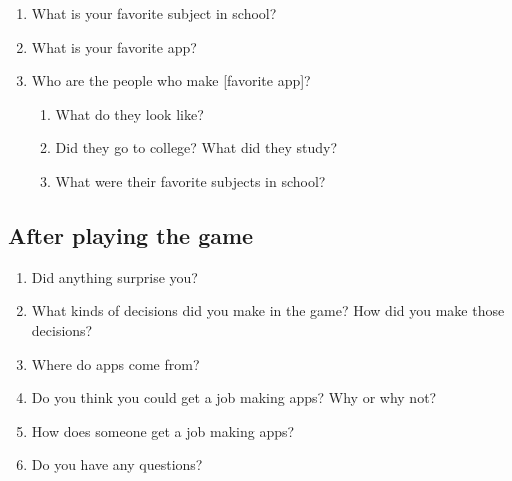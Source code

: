 \documentclass[letterpaper]{article}
\begin{document}
\begin{enumerate}
\item What is your favorite subject in school?
\item What is your favorite app?
\item Who are the people who make [favorite app]?
\begin{enumerate}
\item What do they look like?
\item Did they go to college? What did they study?
\item What were their favorite subjects in school?
\end{enumerate}
\end{enumerate}

\subsection*{After playing the game}

\begin{enumerate}
\item Did anything surprise you?
\item What kinds of decisions did you make in the game? How did you make those decisions?
\item Where do apps come from?
\item Do you think you could get a job making apps? Why or why not?
\item How does someone get a job making apps?
\item Do you have any questions?
\end{enumerate}

\clearpage
\end{document}
